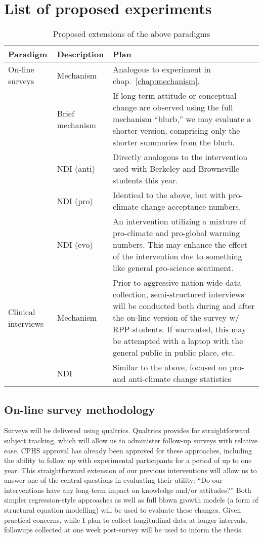 \section{List of proposed experiments}

\begin{table}
\begin{tabular}{llp{}}
Paradigm & Description & Plan \\
\hline \hline
On-line surveys
    & Mechanism &  Analogous to experiment in chap.~\ref{chap:mechanism}. \\
    & Brief mechanism & If long-term attitude or conceptual change are observed
        using the full mechanism ``blurb,'' we may evaluate a shorter version,
        comprising only the shorter summaries from the blurb. \\
    & NDI (anti) & Directly analogous to the intervention used with Berkeley and
        Brownsville students this year. \\
    & NDI (pro) & Identical to the above, but with pro-climate change acceptance
        numbers. \\
    & NDI (evo) & An intervention utilizing a mixture of pro-climate and
        pro-global warming numbers. This may enhance the effect of the
        intervention due to something like general pro-science sentiment. \\

Clinical interviews 
    & Mechanism & Prior to aggressive nation-wide data collection,
    semi-structured interviews will be conducted both during and after the
    on-line version of the survey w/ RPP students. If warranted, this may be
    attempted with a laptop with the general public in public place, etc. \\
    & NDI & Similar to the above, focused on pro- and anti-climate change
        statistics \\
\hline
\end{tabular}
\caption{Proposed extensions of the above paradigms}
\label{table:proposed}
\end{table}

\subsection{On-line survey methodology}

Surveys will be delivered using qualtrics. Qualtrics provides for
straightforward subject tracking, which will allow us to administer follow-up
surveys with relative ease. CPHS approval has already been approved for these
approaches, including the ability to follow up with experimental participants
for a period of up to one year. This straightforward extension of our previous
interventions will allow us to answer one of the central questions in evaluating
their utility: ``Do our interventions have any long-term impact on knowledge
and/or attitudes?'' Both simpler regression-style approaches as well as full
blown growth models (a form of structural equation modelling) will be used to
evaluate these changes. Given practical concerns, while I plan to collect
longitudinal data at longer intervals, followups collected at one week
post-survey will be used to inform the thesis.


